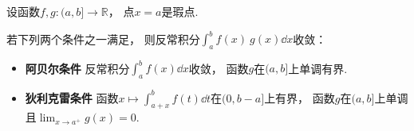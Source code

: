 \begin{theorem}\label{theorem:反常积分.无界函数的反常积分的阿贝尔--狄利克雷审敛法}
设函数\(f,g\colon(a,b]\to\mathbb{R}\)，
点\(x=a\)是瑕点.

若下列两个条件之一满足，
则反常积分\(\int_a^b f(x) ~ g(x) \dd{x}\)收敛：\begin{itemize}
	\item {\bf 阿贝尔条件}
	反常积分\(\int_a^b f(x) \dd{x}\)收敛，
	函数\(g\)在\((a,b]\)上单调有界.

	\item {\bf 狄利克雷条件}
	函数\(x \mapsto \int_{a+x}^b f(t) \dd{t}\)在\((0,b-a]\)上有界，
	函数\(g\)在\((a,b]\)上单调且\(\lim_{x \to a^+} g(x) = 0\).
\end{itemize}
\end{theorem}

